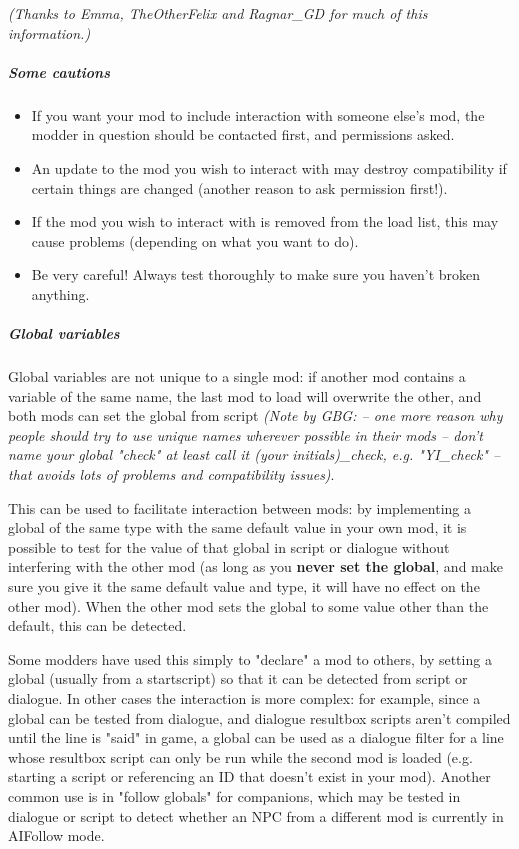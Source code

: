 \emph{(Thanks to Emma, TheOtherFelix and Ragnar\_GD for much of this
information.)}

\hypertarget{some-cautions}{%
\subparagraph{Some cautions}\label{some-cautions}}

\begin{itemize}
\item
  If you want your mod to include interaction with someone else's mod,
  the modder in question should be contacted first, and permissions
  asked.
\item
  An update to the mod you wish to interact with may destroy
  compatibility if certain things are changed (another reason to ask
  permission first!).
\item
  If the mod you wish to interact with is removed from the load list,
  this may cause problems (depending on what you want to do).
\item
  Be very careful! Always test thoroughly to make sure you haven't
  broken anything.
\end{itemize}

\hypertarget{global-variables-1}{%
\subparagraph{Global variables}\label{global-variables-1}}

Global variables are not unique to a single mod: if another mod contains
a variable of the same name, the last mod to load will overwrite the
other, and both mods can set the global from script \emph{(Note by GBG:
-- one more reason why people should try to use unique names wherever
possible in their mods -- don't name your global "check" at least call
it (your initials)\_check, e.g. "YI\_check" -- that avoids lots of
problems and compatibility issues)}.

This can be used to facilitate interaction between mods: by implementing
a global of the same type with the same default value in your own mod,
it is possible to test for the value of that global in script or
dialogue without interfering with the other mod (as long as you
\textbf{never set the global}, and make sure you give it the same
default value and type, it will have no effect on the other mod). When
the other mod sets the global to some value other than the default, this
can be detected.

Some modders have used this simply to "declare" a mod to others, by
setting a global (usually from a startscript) so that it can be detected
from script or dialogue. In other cases the interaction is more complex:
for example, since a global can be tested from dialogue, and dialogue
resultbox scripts aren't compiled until the line is "said" in game, a
global can be used as a dialogue filter for a line whose resultbox
script can only be run while the second mod is loaded (e.g. starting a
script or referencing an ID that doesn't exist in your mod). Another
common use is in "follow globals" for companions, which may be tested in
dialogue or script to detect whether an NPC from a different mod is
currently in AIFollow mode.

